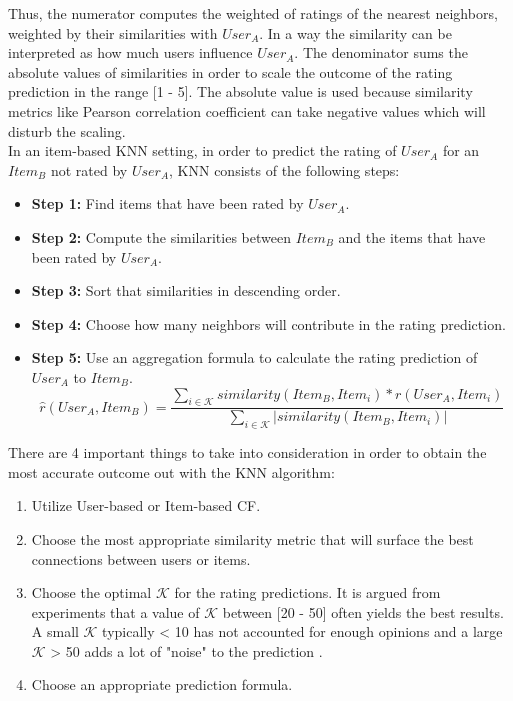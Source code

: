 Thus, the numerator computes the weighted of ratings of the nearest neighbors,
weighted by their similarities with $User_A$.
In a way the similarity can be interpreted as how much users influence
$User_A$. The denominator sums the absolute values of similarities in order to scale the
outcome of the rating prediction in the range [1 - 5]. The absolute value is used because
similarity metrics like Pearson correlation coefficient can take negative values which
will disturb the scaling.\\

In an item-based KNN setting, in order to predict the rating of $User_A$ for an
$Item_B$ not rated by $User_A$, KNN consists of the following steps:
\begin{itemize}
	\item[] \textbf{Step 1:} Find items that have been rated by $User_A$.
	\item[] \textbf{Step 2:} Compute the similarities between $Item_B$ and the items that have
	been rated by $User_A$.
	\item[] \textbf{Step 3:}  Sort that similarities in descending order.
	\item[] \textbf{Step 4:}  Choose how many neighbors will contribute in the rating
	prediction.
	\item[] \textbf{Step 5:} Use an aggregation formula to calculate the rating prediction of
	$User_A$ to $Item_B$.
\begin{equation}\label{nearest_neighbors}
	\hat{r}(User_A,Item_B) = \frac{\sum_{i \in \mathcal{K}}{similarity(Item_B,Item_i) * r(User_A,Item_i)}}
						    {\sum_{i \in \mathcal{K}}{\mathopen|similarity(Item_B,Item_i)\mathclose|}}
\end{equation}
\end{itemize}

There are 4 important things to take into consideration in order to obtain the most accurate
outcome out with the KNN algorithm:
\begin{enumerate}
	\item Utilize User-based or Item-based CF.
	\item Choose the most appropriate similarity metric that will surface the best connections
	between users or items.
	\item Choose the optimal $\mathcal{K}$ for the rating predictions. It is argued from
	experiments that a value of $\mathcal{K}$ between [20 - 50] often yields the best
	results. A small $\mathcal{K}$ typically < 10 has not accounted for enough opinions and a
	large $\mathcal{K}$ > 50 adds a lot of "noise" to the prediction \citep{herlocker2002empirical,Jannach}.
	\item Choose an appropriate prediction formula.
\end{enumerate}

